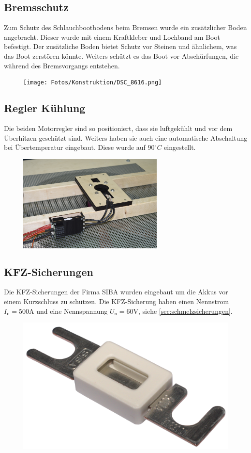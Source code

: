 \newpage
\subsection{Bremsschutz}
Zum Schutz des Schlauchbootbodens beim Bremsen wurde ein zusätzlicher Boden angebracht. Dieser wurde mit einem Kraftkleber und Lochband am Boot befestigt. 
Der zusätzliche Boden bietet Schutz vor Steinen und ähnlichem, was das Boot zerstören könnte. Weiters schützt es das Boot 
vor Abschürfungen, die während des Bremsvorgangs entstehen. 

\begin{figure}[H]
    \centering
    \texttt{[image: Fotos/Konstruktion/DSC\_8616.png]}
\end{figure}


\subsection{Regler Kühlung}
Die beiden Motorregler sind so positioniert, dass sie luftgekühlt und vor dem Überhitzen geschützt sind. Weiters haben sie auch eine automatische Abschaltung bei Übertemperatur
eingebaut. Diese wurde auf $90^\circ C$ eingestellt. 

\begin{figure}[H]
    \centering
    \includegraphics[width=0.65\textwidth]{Fotos/Gitter_unten.jpg}
\end{figure}

\subsection{KFZ-Sicherungen}
Die KFZ-Sicherungen der Firma SIBA wurden eingebaut um die Akkus vor einem Kurzschluss zu schützen. Die KFZ-Sicherung haben einen Nennstrom $I_\mathrm{n} = 500\mathrm{A}$
und eine Nennspannung $U_\mathrm{n} = 60 \mathrm{V}$, siehe \autoref{sec:schmelzsicherungen}.

\begin{figure}[H]
    \centering
    \includegraphics[width=.6\textwidth]{Fotos/kfz_Sicherung.png}
\end{figure}
